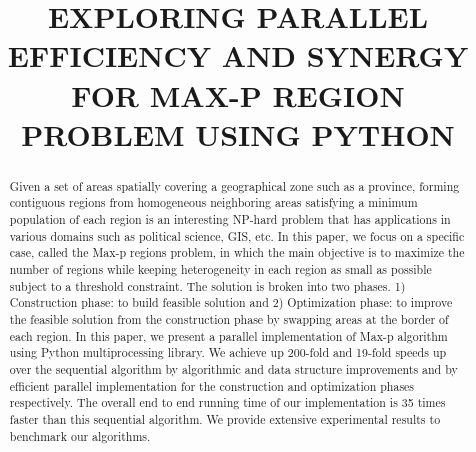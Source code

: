 \documentclass[conference]{IEEEtran}
\begin{document}
\pagestyle{plain}

\title{EXPLORING PARALLEL EFFICIENCY AND SYNERGY FOR MAX-P REGION PROBLEM USING PYTHON\\
}

\author{
\and
{}
\and
{}
\and
{}
}

\maketitle

\begin{abstract}
Given a set of areas spatially covering a geographical zone such as a
province, forming contiguous regions from homogeneous neighboring areas
satisfying a minimum population of each region is an interesting
NP-hard problem that has applications in various domains such as political
science, GIS, etc. In this paper, we focus on a specific case, called the Max-p
regions problem, in which the main objective is to maximize the number of regions while
keeping heterogeneity in each region as small as possible subject to a threshold
constraint. The solution is
broken into two phases. 1) Construction phase: to build feasible solution and
2) Optimization phase: to improve the feasible solution from the construction phase by swapping
areas at the border of each region. In this paper, we
present a parallel implementation of Max-p algorithm using Python multiprocessing
library. We achieve up 200-fold and 19-fold speeds up over the sequential algorithm by algorithmic and data structure improvements and by efficient parallel implementation for
the construction and optimization phases respectively. The overall end to
end running time of our implementation is 35 times faster than this sequential
algorithm. We provide extensive experimental results to benchmark our algorithms.
\end{abstract}
\end{document}
